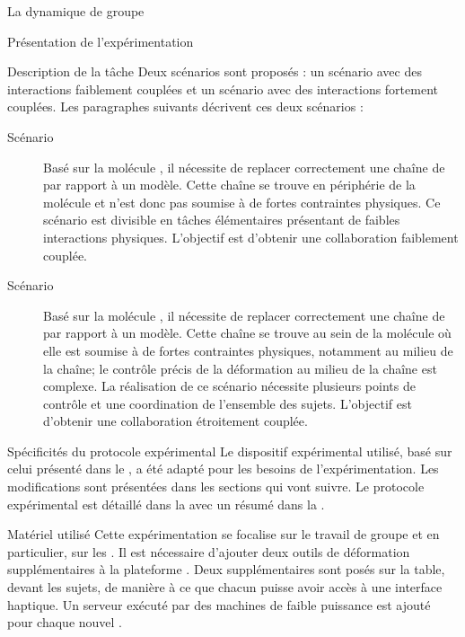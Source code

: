\documentclass[myfrancais,ngerman,english,frenchb]{mythesis}
\begin{document}
\begin{mychapter}{La dynamique de groupe}
\begin{mysection}{Présentation de l'expérimentation}
\begin{mysubsection}{Description de la tâche}
				Deux scénarios sont proposés : un scénario avec des interactions faiblement couplées et un scénario avec des interactions fortement couplées.
				Les paragraphes suivants décrivent ces deux scénarios :
				\begin{description}
					\item[Scénario~]
						Basé sur la molécule \myPrion, il nécessite de replacer correctement une chaîne de ~ par rapport à un modèle.
						Cette chaîne se trouve en périphérie de la molécule et n'est donc pas soumise à de fortes contraintes physiques.
						Ce scénario est divisible en tâches élémentaires présentant de faibles interactions physiques.
						L'objectif est d'obtenir une collaboration faiblement couplée.
					\item[Scénario~]
						Basé sur la molécule \myUbiquitin, il nécessite de replacer correctement une chaîne de ~ par rapport à un modèle.
						Cette chaîne se trouve au sein de la molécule où elle est soumise à de fortes contraintes physiques, notamment au milieu de la chaîne; le contrôle précis de la déformation au milieu de la chaîne est complexe.
						La réalisation de ce scénario nécessite plusieurs points de contrôle et une coordination de l'ensemble des sujets.
						L'objectif est d'obtenir une collaboration étroitement couplée.
				\end{description}
			\end{mysubsection}
			\begin{mysubsection}{Spécificités du protocole expérimental}
				Le dispositif expérimental utilisé, basé sur celui présenté dans le , a été adapté pour les besoins de l'expérimentation.
				Les modifications sont présentées dans les sections qui vont suivre.
				Le protocole expérimental est détaillé dans la  avec un résumé dans la .
				\begin{mysubsubsection}{Matériel utilisé}
					Cette expérimentation se focalise sur le travail de groupe et en particulier, sur les .
					Il est nécessaire d'ajouter deux outils de déformation supplémentaires à la plateforme .
					Deux \myOmni supplémentaires sont posés sur la table, devant les sujets, de manière à ce que chacun puisse avoir accès à une interface haptique.
					Un serveur  exécuté par des machines de faible puissance est ajouté pour chaque nouvel \myOmni.


\end{mysubsubsection}
\end{mysubsection}
\end{mysection}
\end{mychapter}
\end{document}
